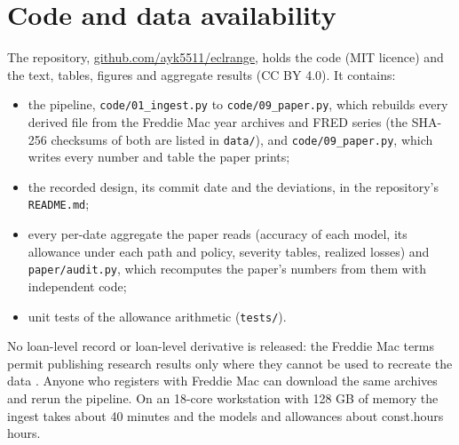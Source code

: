 \section{Code and data availability}\label{sec:availability}

The repository,
\href{https://github.com/ayk5511/eclrange}{github.com/ayk5511/eclrange}, holds
the code (MIT licence) and the text, tables, figures and aggregate results
(CC BY 4.0). It contains:
\begin{itemize}[nosep]
\item the pipeline, \texttt{code/01\_ingest.py} to \texttt{code/09\_paper.py},
which rebuilds every derived file from the Freddie Mac year archives and FRED
series (the SHA-256 checksums of both are listed in \texttt{data/}), and
\texttt{code/09\_paper.py}, which writes every number and table the paper
prints;
\item the recorded design, its commit date and the deviations, in the
repository's \texttt{README.md};
\item every per-date aggregate the paper reads (accuracy of each model, its
allowance under each path and policy, severity tables, realized losses) and
\texttt{paper/audit.py}, which recomputes the paper's numbers from them with
independent code;
\item unit tests of the allowance arithmetic (\texttt{tests/}).
\end{itemize}
No loan-level record or loan-level derivative is released: the Freddie Mac
terms permit publishing research results only where they cannot be used to
recreate the data \citep{FreddieTerms2025}. Anyone who registers with Freddie
Mac can download the same archives and rerun the pipeline. On an 18-core
workstation with 128 GB of memory the ingest takes about 40 minutes and the
models and allowances about \num{const.hours} hours.
